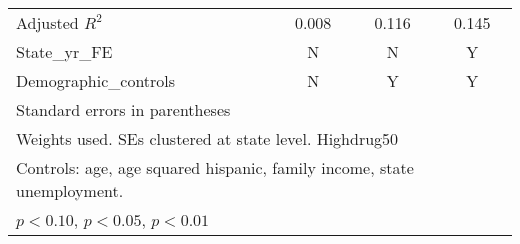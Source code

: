 \begin{table}[htbp]
\begin{tabular}{l*{3}{c}}
Adjusted \(R^{2}\)  &       0.008         &       0.116         &       0.145         \\
State\_yr\_FE         &           N         &           N         &           Y         \\
Demographic\_controls&           N         &           Y         &           Y         \\
\hline\hline
\multicolumn{4}{l}{\footnotesize Standard errors in parentheses}\\
\multicolumn{4}{l}{\footnotesize Weights used. SEs clustered at state level. Highdrug50}\\
\multicolumn{4}{l}{\footnotesize Controls: age, age squared hispanic, family income, state unemployment.}\\
\multicolumn{4}{l}{\footnotesize \sym{*} \(p<0.10\), \sym{**} \(p<0.05\), \sym{***} \(p<0.01\)}\\
\end{tabular}
\end{table}
